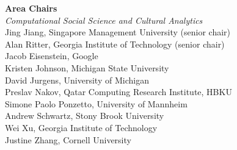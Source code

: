 {\bf Area Chairs} \\
\emph{Computational Social Science and Cultural Analytics} \\
\hspace*{0.2in} Jing Jiang, Singapore Management University (senior chair)\\
\hspace*{0.2in} Alan Ritter, Georgia Institute of Technology (senior chair)\\
\hspace*{0.2in} Jacob Eisenstein, Google\\
\hspace*{0.2in} Kristen Johnson, Michigan State University\\
\hspace*{0.2in} David Jurgens, University of Michigan\\
\hspace*{0.2in} Preslav Nakov, Qatar Computing Research Institute, HBKU\\
\hspace*{0.2in} Simone Paolo Ponzetto, University of Mannheim\\
\hspace*{0.2in} Andrew Schwartz, Stony Brook University\\
\hspace*{0.2in} Wei Xu, Georgia Institute of Technology\\
\hspace*{0.2in} Justine Zhang, Cornell University\\

